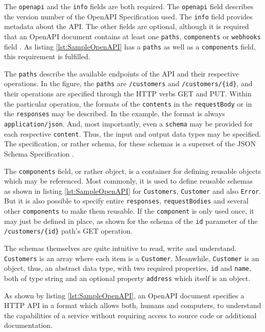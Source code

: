 The \lstinline|openapi| and the \lstinline|info| fields are both required. The \lstinline|openapi| field describes the version number of the OpenAPI Specification used. The \lstinline|info| field provides metadata about the API. The other fields are optional, although it is required that an OpenAPI document contains at least one \lstinline|paths|, \lstinline|components| or \lstinline|webhooks| field \cite{OpenAPISpec}. As listing \ref{lst:SampleOpenAPI} has a \lstinline|paths| as well as a \lstinline|components| field, this requirement is fulfilled.\par
The \lstinline|paths| describe the available endpoints of the API and their respective operations. In the figure, the \lstinline|paths| are \lstinline|/customers| and \lstinline|/customers/{id}|, and their operations are specified through the HTTP verbs GET and PUT. Within the particular operation, the formats of the \lstinline|contents| in the \lstinline|requestBody| or in the \lstinline|responses| may be described. In the example, the format is always \lstinline|application/json|. And, most importantly, even a \lstinline|schema| may be provided for each respective \lstinline|content|. Thus, the input and output data types may be specified. The specification, or rather schema, for these schemas is a superset of the JSON Schema Specification \cite{OpenAPISubset}.\par 
The \lstinline|components| field, or rather object, is a container for defining reusable objects which may be referenced. Most commonly, it is used to define reusable schemas as shown in listing \ref{lst:SampleOpenAPI} for \lstinline|Customers|, \lstinline|Customer| and also \lstinline|Error|. But it is also possible to specify entire \lstinline|responses|, \lstinline|requestBodies| and several other \lstinline|components| to make them reusable. If the \lstinline|component| is only used once, it may just be defined in place, as shown for the schema of the \lstinline|id| parameter of the \lstinline|/customers/{id}| path's GET operation.\par
The schemas themselves are quite intuitive to read, write and understand. \lstinline|Customers| is an array where each item is a \lstinline|Customer|. Meanwhile, \lstinline|Customer| is an object, thus, an abstract data type, with two required properties, \lstinline|id| and \lstinline|name|, both of type string and an optional property \lstinline|address| which itself is an object.\par
As shown by listing \ref{lst:SampleOpenAPI}, an OpenAPI document specifies a HTTP API in a format which allows both, humans and computers, to understand the capabilities of a service without requiring access to source code or additional documentation.\par
